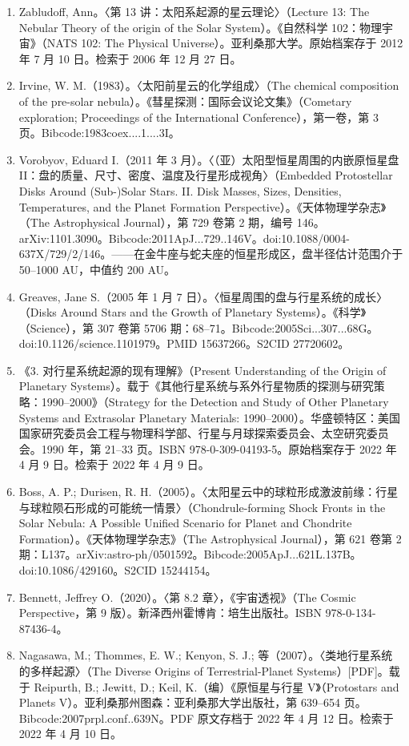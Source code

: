 \begin{enumerate}
\item Zabludoff, Ann。〈第 13 讲：太阳系起源的星云理论〉（Lecture 13: The Nebular Theory of the origin of the Solar System）。《自然科学 102：物理宇宙》（NATS 102: The Physical Universe）。亚利桑那大学。原始档案存于 2012 年 7 月 10 日。检索于 2006 年 12 月 27 日。
\item Irvine, W. M.（1983）。〈太阳前星云的化学组成〉（The chemical composition of the pre-solar nebula）。《彗星探测：国际会议论文集》（Cometary exploration; Proceedings of the International Conference），第一卷，第 3 页。Bibcode:1983coex....1....3I。
\item Vorobyov, Eduard I.（2011 年 3 月）。〈（亚）太阳型恒星周围的内嵌原恒星盘 II：盘的质量、尺寸、密度、温度及行星形成视角〉（Embedded Protostellar Disks Around (Sub-)Solar Stars. II. Disk Masses, Sizes, Densities, Temperatures, and the Planet Formation Perspective）。《天体物理学杂志》（The Astrophysical Journal），第 729 卷第 2 期，编号 146。arXiv:1101.3090。Bibcode:2011ApJ...729..146V。doi:10.1088/0004-637X/729/2/146。——在金牛座与蛇夫座的恒星形成区，盘半径估计范围介于 50–1000 AU，中值约 200 AU。
\item Greaves, Jane S.（2005 年 1 月 7 日）。〈恒星周围的盘与行星系统的成长〉（Disks Around Stars and the Growth of Planetary Systems）。《科学》（Science），第 307 卷第 5706 期：68–71。Bibcode:2005Sci...307...68G。doi:10.1126/science.1101979。PMID 15637266。S2CID 27720602。
\item 《3. 对行星系统起源的现有理解》（Present Understanding of the Origin of Planetary Systems）。载于《其他行星系统与系外行星物质的探测与研究策略：1990–2000》（Strategy for the Detection and Study of Other Planetary Systems and Extrasolar Planetary Materials: 1990–2000）。华盛顿特区：美国国家研究委员会工程与物理科学部、行星与月球探索委员会、太空研究委员会。1990 年，第 21–33 页。ISBN 978-0-309-04193-5。原始档案存于 2022 年 4 月 9 日。检索于 2022 年 4 月 9 日。
\item Boss, A. P.; Durisen, R. H.（2005）。〈太阳星云中的球粒形成激波前缘：行星与球粒陨石形成的可能统一情景〉（Chondrule-forming Shock Fronts in the Solar Nebula: A Possible Unified Scenario for Planet and Chondrite Formation）。《天体物理学杂志》（The Astrophysical Journal），第 621 卷第 2 期：L137。arXiv:astro-ph/0501592。Bibcode:2005ApJ...621L.137B。doi:10.1086/429160。S2CID 15244154。
\item Bennett, Jeffrey O.（2020）。〈第 8.2 章〉，《宇宙透视》（The Cosmic Perspective，第 9 版）。新泽西州霍博肯：培生出版社。ISBN 978-0-134-87436-4。
\item Nagasawa, M.; Thommes, E. W.; Kenyon, S. J.; 等（2007）。〈类地行星系统的多样起源〉（The Diverse Origins of Terrestrial-Planet Systems）[PDF]。载于 Reipurth, B.; Jewitt, D.; Keil, K.（编）《原恒星与行星 V》（Protostars and Planets V）。亚利桑那州图森：亚利桑那大学出版社，第 639–654 页。Bibcode:2007prpl.conf..639N。PDF 原文存档于 2022 年 4 月 12 日。检索于 2022 年 4 月 10 日。

\end{enumerate}
